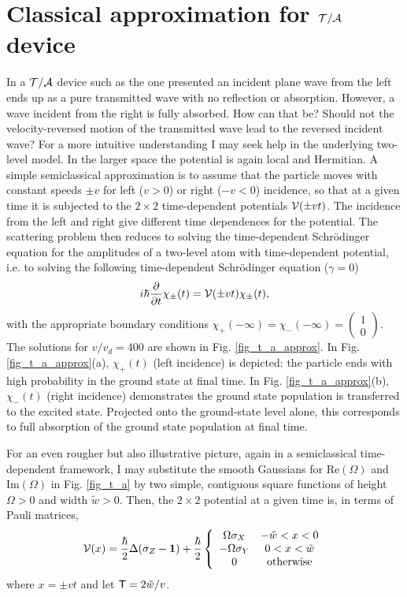 \section{Classical approximation for ${\cal T/A}$ device \label{class}}
%
%
In a ${\cal T/A}$ device such as the one presented an incident plane wave from the left ends up as a pure transmitted wave with no reflection or absorption.
However, a wave incident from the right is fully absorbed. How can that be? Should not the velocity-reversed motion
of the transmitted wave lead to the reversed incident wave?
For a more intuitive understanding I may seek help in the underlying two-level model.
In the larger space the potential is again local and Hermitian. A simple semiclassical
approximation is to assume that the particle moves with  constant speeds $\pm v$ for left ($v>0$) or right ($-v<0$) incidence,  so that at a given time it is subjected to  the $2\times2$ time-dependent potentials
${\cal V}(\pm vt)$. The incidence from the left and right give different time dependences for the potential. The scattering problem then reduces to solving the time-dependent Schr\"odinger equation for the amplitudes of a two-level atom with time-dependent potential, i.e. to solving the following time-dependent Schr\"odinger equation ($\gamma = 0$)
%
\begin{eqnarray}
  i \hbar \frac{\partial}{\partial t} \chi_\pm(t)
  = {\cal V} (\pm v t) \chi_\pm(t),
\end{eqnarray}
%
with the appropriate boundary conditions $\chi_+ (-\infty) = \chi_- (-\infty) =\left(\begin{smallmatrix} 1\\ 0\end{smallmatrix}\right)$. The  solutions for $v/v_d = 400$
are shown in Fig. \ref{fig_t_a_approx}.
In Fig. \ref{fig_t_a_approx}(a), $\chi_+ (t)$ (left incidence) is depicted:  the particle ends  with high probability in the ground state at final time. In Fig. \ref{fig_t_a_approx}(b), $\chi_- (t)$ (right incidence) demonstrates  the ground state population is transferred to the excited state. Projected onto the ground-state level alone,
this corresponds to full absorption of the ground state population at final time.

For an  even rougher but also illustrative picture,  again in a semiclassical time-dependent framework, I  may substitute the smooth Gaussians for Re$(\Omega)$ and Im$(\Omega)$ in Fig. \ref{fig_t_a} by two simple, contiguous square functions of height
$\Omega>0$ and width $\tilde{w} > 0$. Then, the $2\times2$ potential at a given time is, in terms of Pauli matrices,
%
\begin{eqnarray}
  {\cal V} (x) = \frac{\hbar}{2}\Delta (\sigma_Z-{\mathbf 1})+ \frac{\hbar}{2} \left\{\begin{array}{cc}
  \Omega\sigma_X & -\tilde w < x < 0\\
  -\Omega\sigma_Y & 0 < x < \tilde w\\
  0 & \mbox{otherwise}
  \end{array}\right.
\end{eqnarray}
%
where $x = \pm v t$ and let ${\sf T}=2 \tilde w/v$.

